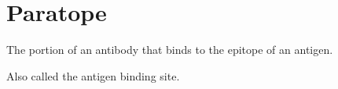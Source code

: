 \section{Paratope}
\label{Glossary:Paratope}

The portion of an antibody that binds to the epitope of an antigen.

Also called the antigen binding site.
